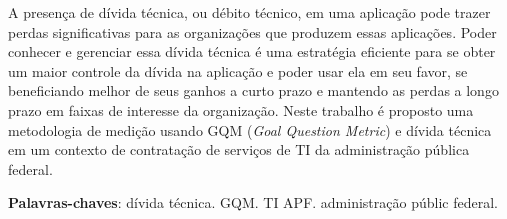 \begin{resumo}
A presença de dívida técnica, ou débito técnico, em uma aplicação pode trazer perdas significativas para as organizações que produzem essas aplicações. Poder conhecer e gerenciar essa dívida técnica é uma estratégia eficiente para se obter um maior controle da dívida na aplicação e poder usar ela em seu favor, se beneficiando melhor de seus ganhos a curto prazo e mantendo as perdas a longo prazo em faixas de interesse da organização. Neste trabalho é proposto uma metodologia de medição usando GQM (\textit{Goal Question Metric}) e dívida técnica em um contexto de contratação de serviços de TI da administração pública federal.

 \vspace{\onelineskip}
    
 \noindent
 \textbf{Palavras-chaves}: dívida técnica. GQM. TI APF. administração públic federal.
\end{resumo}
